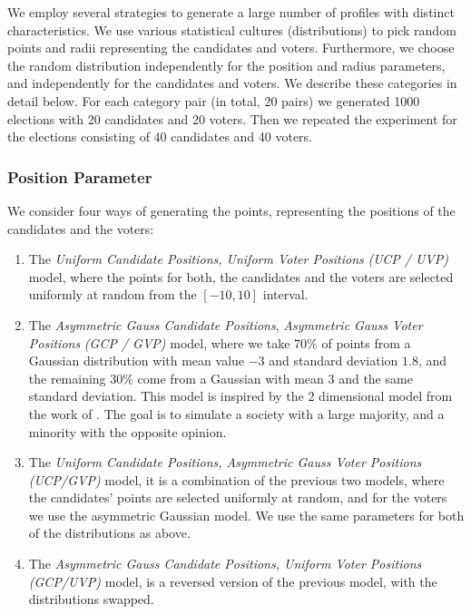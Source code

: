 We employ several strategies to generate a large number of profiles with distinct characteristics.
We use various statistical cultures (distributions) to pick random points and radii representing the candidates and voters.
Furthermore, we choose the random distribution independently for the position and radius parameters,
and independently for the candidates and voters.
We describe these categories in detail below.
For each category pair (in total, 20 pairs) we generated 1000 elections with 20 candidates and 20 voters.
Then we repeated the experiment for the elections consisting of 40 candidates and 40 voters.
 
\subsubsection{Position Parameter}
We consider four ways of generating the points, representing the positions of the candidates and the voters:

\begin{enumerate}
    \item The \textit{Uniform Candidate Positions, Uniform Voter Positions} \textit{(UCP / UVP)} model,
    where the points for both, the candidates and the voters are selected uniformly at random from the $[-10,10]$ interval.
    
    \item The \textit{Asymmetric Gauss Candidate Positions}, \textit{Asymmetric Gauss Voter Positions} 
    \textit{(GCP / GVP)} model,
    where we take 70\% of points from a Gaussian distribution with mean value $-3$ and standard deviation $1.8$,
    and the remaining 30\% come from a Gaussian with mean $3$ and the same standard deviation. 
    This model is inspired by the 2 dimensional model from the work of \cite{faliszewski-vcr}. 
    The goal is to simulate a society with a large majority, and a minority with the opposite opinion. 

    \item The \textit{Uniform Candidate Positions, Asymmetric Gauss Voter Positions (UCP/GVP)} model,
    it is a combination of the previous two models, where
    the candidates' points are selected uniformly at random,
    and for the voters we use the asymmetric Gaussian model.
    We use the same parameters for both of the distributions as above.

    \item The \textit{Asymmetric Gauss Candidate Positions, Uniform Voter Positions (GCP/UVP)} model,
    is a reversed version of the previous model, with the distributions swapped.

\end{enumerate}

